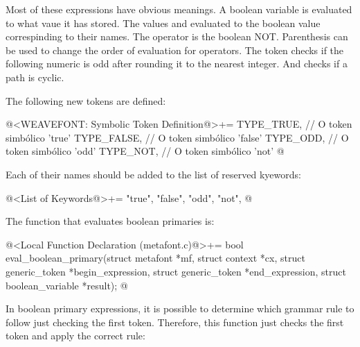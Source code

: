 {{{{{Most of these expressions have obvious meanings. A boolean variable is
evaluated to what vaue it has stored. The values 
and  evaluated to the boolean value correspinding to
their names. The  operator is the boolean
NOT. Parenthesis can be used to change the order of evaluation for
operators. The token  checks if the following numeric
is odd after rounding it to the nearest
integer. And  checks if a path is cyclic.

The following new tokens are defined:

\iniciocodigo
@<WEAVEFONT: Symbolic Token Definition@>+=
TYPE_TRUE,                    // O token simbólico 'true'
TYPE_FALSE,                   // O token simbólico 'false'
TYPE_ODD,                     // O token simbólico 'odd'
TYPE_NOT,                     // O token simbólico 'not'
@
\fimcodigo

Each of their names should be added to the list of reserved kyewords:

\iniciocodigo
@<List of Keywords@>+=
"true", "false", "odd", "not",
@
\fimcodigo

The function that evaluates boolean primaries is:

\iniciocodigo
@<Local Function Declaration (metafont.c)@>+=
bool eval_boolean_primary(struct metafont *mf, struct context *cx,
                          struct generic_token *begin_expression,
                          struct generic_token *end_expression,
                          struct boolean_variable *result);
@
\fimcodigo

In boolean primary expressions, it is possible to determine which
grammar rule to follow just checking the first token. Therefore, this
function just checks the first token and apply the correct rule:

}}}}}
